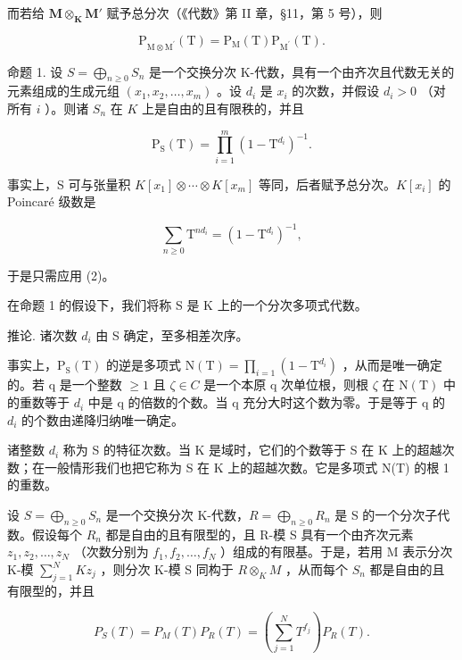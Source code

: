 而若给 \(\mathbf{M} \otimes_{\mathbf{K}} \mathbf{M}'\) 赋予总分次（《代数》第 II 章，§11，第 5 号），则

\[
\mathrm{P} _ {\mathrm{M} \otimes \mathrm{M} ^ {\prime}} (\mathrm{T}) = \mathrm{P} _ {\mathrm{M}} (\mathrm{T}) \mathrm{P} _ {\mathrm{M} ^ {\prime}} (\mathrm{T}).\tag{2}
\]

命题 1. 设 \(S = \bigoplus_{n \geqslant 0} S_n\) 是一个交换分次 K-代数，具有一个由齐次且代数无关的元素组成的生成元组 \((x_1, x_2, \ldots, x_m)\) 。设 \(d_i\) 是 \(x_i\) 的次数，并假设 \(d_i > 0\) （对所有 \(i\) ）。则诸 \(S_n\) 在 \(K\) 上是自由的且有限秩的，并且

\[
\mathrm{P} _ {\mathrm{S}} (\mathrm{T}) = \prod_ {i = 1} ^ {m} (1 - \mathrm{T} ^ {d _ {i}}) ^ {- 1}.\tag{3}
\]

事实上，S 可与张量积 \(K[x_{1}] \otimes \cdots \otimes K[x_{m}]\) 等同，后者赋予总分次。\(K[x_{i}]\) 的 Poincaré 级数是

\[
\sum_ {n \geqslant 0} \mathrm{T} ^ {n d _ {i}} = (1 - \mathrm{T} ^ {d _ {i}}) ^ {- 1},
\]

于是只需应用 (2)。

在命题 1 的假设下，我们将称 S 是 K 上的一个分次多项式代数。

推论. 诸次数 \(d_{i}\) 由 S 确定，至多相差次序。

事实上，\(\mathrm{P}_{\mathrm{S}}(\mathrm{T})\) 的逆是多项式 \(\mathrm{N}(\mathrm{T}) = \prod_{i=1}(1 - \mathrm{T}^{d_i})\) ，从而是唯一确定的。若 q 是一个整数 \(\geqslant 1\) 且 \(\zeta \in C\) 是一个本原 q 次单位根，则根 \(\zeta\) 在 \(\mathrm{N}(\mathrm{T})\) 中的重数等于 \(d_{i}\) 中是 q 的倍数的个数。当 q 充分大时这个数为零。于是等于 q 的 \(d_{i}\) 的个数由递降归纳唯一确定。

诸整数 \(d_{i}\) 称为 S 的特征次数。当 K 是域时，它们的个数等于 S 在 K 上的超越次数；在一般情形我们也把它称为 S 在 K 上的超越次数。它是多项式 N(T) 的根 1 的重数。

设 \(S = \bigoplus_{n \geqslant 0} S_n\) 是一个交换分次 K-代数，\(R = \bigoplus_{n \geqslant 0} R_n\) 是 S 的一个分次子代数。假设每个 \(R_n\) 都是自由的且有限型的，且 R-模 S 具有一个由齐次元素 \(z_1, z_2, \ldots, z_N\) （次数分别为 \(f_1, f_2, \ldots, f_N\) ）组成的有限基。于是，若用 M 表示分次 K-模 \(\sum_{j=1}^{N} Kz_j\) ，则分次 K-模 S 同构于 \(R \otimes_K M\) ，从而每个 \(S_n\) 都是自由的且有限型的，并且

\[
P _ {S} (T) = P _ {M} (T) P _ {R} (T) = \left(\sum_ {j = 1} ^ {N} T ^ {f _ {j}}\right) P _ {R} (T).\tag{4}
\]

